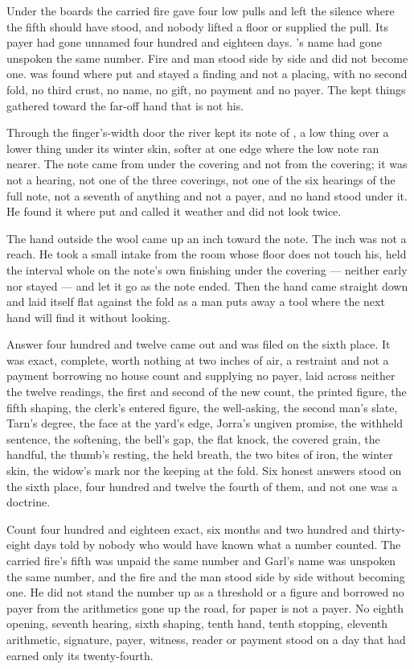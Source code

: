 Under the boards the carried fire gave four low pulls and left the silence where the fifth should have stood, and nobody lifted a floor or supplied the pull. Its payer had gone unnamed four hundred and eighteen days. 's name had gone unspoken the same number. Fire and man stood side by side and did not become one.  was found where put and stayed a finding and not a placing, with no second fold, no third crust, no name, no gift, no payment and no payer. The kept things gathered toward the far-off hand that is not his.

Through the finger's-width door the river kept its note of , a low thing over a lower thing under its winter skin, softer at one edge where the low note ran nearer. The note came from under the covering and not from the covering; it was not a hearing, not one of the three coverings, not one of the six hearings of the full note, not a seventh of anything and not a payer, and no hand stood under it. He found it where put and called it weather and did not look twice.

The hand outside the wool came up an inch toward the note. The inch was not a reach. He took a small intake from the room whose floor does not touch his, held the interval whole on the note's own finishing under the covering --- neither early nor stayed --- and let it go as the note ended. Then the hand came straight down and laid itself flat against the fold as a man puts away a tool where the next hand will find it without looking.

Answer four hundred and twelve came out and was filed on the sixth place. It was exact, complete, worth nothing at two inches of air, a restraint and not a payment borrowing no house count and supplying no payer, laid across neither the twelve readings, the first and second of the new count, the printed figure, the fifth shaping, the clerk's entered figure, the well-asking, the second man's slate, Tarn's degree, the face at the yard's edge, Jorra's ungiven promise, the withheld sentence, the softening, the bell's gap, the flat knock, the covered grain, the handful, the thumb's resting, the held breath, the two bites of iron, the winter skin, the widow's mark nor the keeping at the fold. Six honest answers stood on the sixth place, four hundred and twelve the fourth of them, and not one was a doctrine.

Count four hundred and eighteen exact, six months and two hundred and thirty-eight days told by nobody who would have known what a number counted. The carried fire's fifth was unpaid the same number and Garl's name was unspoken the same number, and the fire and the man stood side by side without becoming one. He did not stand the number up as a threshold or a figure and borrowed no payer from the arithmetics gone up the road, for paper is not a payer. No eighth opening, seventh hearing, sixth shaping, tenth hand, tenth stopping, eleventh arithmetic, signature, payer, witness, reader or payment stood on a day that had earned only its twenty-fourth.

